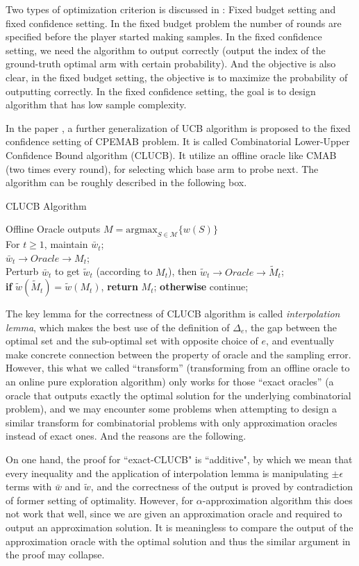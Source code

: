 \documentclass[bachelor]{thuthesis}
\begin{document}
\begin{appendix}
Two types of optimization criterion is discussed in \cite{cpemab}: Fixed budget setting and fixed confidence setting. In the fixed budget problem the number of rounds are specified before the player started making samples. In the fixed confidence setting, we need the algorithm to output correctly (output the index of the ground-truth optimal arm with certain probability). And the objective is also clear, in the fixed budget setting, the objective is to maximize the probability of outputting correctly. In the fixed confidence setting, the goal is to design algorithm that has low sample complexity.

In the paper \cite{cpemab}, a further generalization of UCB algorithm is proposed to the fixed confidence setting of CPEMAB problem. It is called Combinatorial Lower-Upper Confidence Bound algorithm (CLUCB). It utilize an offline oracle like CMAB (two times every round), for selecting which base arm to probe next. The algorithm can be roughly described in the following box.

\begin{algorithm}[h]
\caption{CLUCB Algorithm }
Offline Oracle outputs $M=\text{argmax}_{S \in \mathcal{M}}\{w(S)\}$\\
For $t\ge 1$, maintain $\bar{w}_t$;\\
$\bar{w}_t\to Oracle \to M_t$;\\
Perturb $\bar{w}_t$ to get $\tilde{w}_t$ (according to $M_t$), then $\tilde{w}_t\to Oracle \to \tilde{M}_t$;\\
\textbf{if} $\tilde{w}(\tilde{M}_t)=\tilde{w}(M_t)$, \textbf{return} $M_t$; \textbf{otherwise} continue;
\end{algorithm}

The key lemma for the correctness of CLUCB algorithm is called \emph{interpolation lemma}, which makes the best use of the definition of $\Delta_e$, the gap between the optimal set and the sub-optimal set with opposite choice of $e$, and eventually make concrete connection between the property of oracle and the sampling error. However, this what we called ``transform'' (transforming from an offline oracle to an online pure exploration algorithm) only works for those ``exact oracles'' (a oracle that outputs exactly the optimal solution for the underlying combinatorial problem), and we may encounter some problems when attempting to design a similar transform for combinatorial problems with only approximation oracles instead of exact ones. And the reasons are the following.

On one hand, the proof for ``exact-CLUCB" is ``additive", by which we mean that every inequality and the application of interpolation lemma is manipulating $\pm\epsilon$ terms with $\bar{w}$ and $\tilde{w}$, and the correctness of the output is proved by contradiction of former setting of optimality. However, for $\alpha$-approximation algorithm this does not work that well, since we are given an approximation oracle and required to output an approximation solution. It is meaningless to compare the output of the approximation oracle with the optimal solution and thus the similar argument in the proof may collapse.


\end{appendix}
\end{document}
